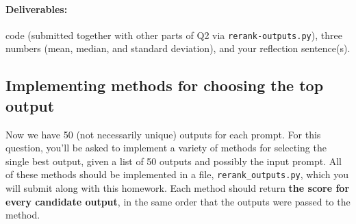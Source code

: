 \documentclass{article}
\begin{document}
\paragraph{Deliverables:} code (submitted together with other parts of Q2 via \texttt{rerank-outputs.py}), three numbers (mean, median, and standard deviation), and your reflection sentence(s).

\begin{solve}

\end{solve}

\subsection{Implementing methods for choosing the top output}
Now we have 50 (not necessarily unique) outputs for each prompt. For this question, you'll be asked to implement a variety of methods for selecting the single best output, given a list of 50 outputs and possibly the input prompt. All of these methods should be implemented in a file, \texttt{rerank\_outputs.py}, which you will submit along with this homework. Each method should return \textbf{the score for every candidate output}, in the same order that the outputs were passed to the method.
\end{document}
